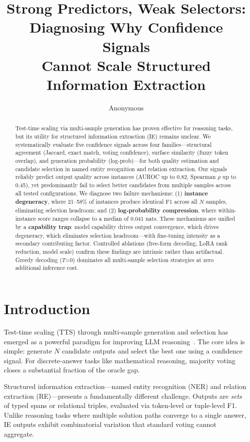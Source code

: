 \documentclass[11pt]{article}
\title{Strong Predictors, Weak Selectors: Diagnosing Why Confidence Signals\\Cannot Scale Structured Information Extraction}
\author{Anonymous}
\begin{document}
\maketitle

\begin{abstract}
Test-time scaling via multi-sample generation has proven effective for reasoning tasks, but its utility for structured information extraction (IE) remains unclear. We systematically evaluate five confidence signals across four families---structural agreement (Jaccard, exact match, voting confidence), surface similarity (fuzzy token overlap), and generation probability (log-prob)---for both quality estimation and candidate selection in named entity recognition and relation extraction. Our signals reliably predict output quality across instances (AUROC up to 0.82, Spearman $\rho$ up to 0.45), yet predominantly fail to select better candidates from multiple samples across all tested configurations. We diagnose two failure mechanisms: (1) \textbf{instance degeneracy}, where 21--58\% of instances produce identical F1 across all $N$ samples, eliminating selection headroom; and (2) \textbf{log-probability compression}, where within-instance score ranges collapse to a median of 0.041 nats. These mechanisms are unified by a \textbf{capability trap}: model capability drives output convergence, which drives degeneracy, which eliminates selection headroom---with fine-tuning intensity as a secondary contributing factor. Controlled ablations (free-form decoding, LoRA rank reduction, model scale) confirm these findings are intrinsic rather than artifactual. Greedy decoding ($T$=0) dominates all multi-sample selection strategies at zero additional inference cost.
\end{abstract}

\section{Introduction}

Test-time scaling (TTS) through multi-sample generation and selection has emerged as a powerful paradigm for improving LLM reasoning~\cite{wang2023selfconsistency,snell2024scaling}. The core idea is simple: generate $N$ candidate outputs and select the best one using a confidence signal. For discrete-answer tasks like mathematical reasoning, majority voting closes a substantial fraction of the oracle gap.

Structured information extraction---named entity recognition (NER) and relation extraction (RE)---presents a fundamentally different challenge. Outputs are \emph{sets} of typed spans or relational triples, evaluated via token-level or tuple-level F1. Unlike reasoning tasks where multiple solution paths converge to a single answer, IE outputs exhibit combinatorial variation that standard voting cannot aggregate.
\end{document}
